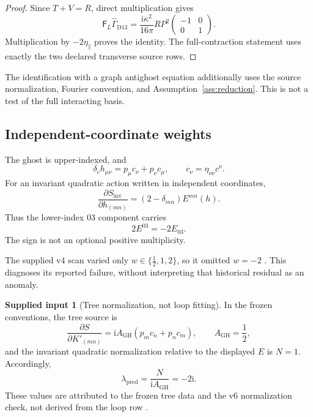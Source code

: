 \documentclass[11pt,a4paper]{article}
\newcommand{\ii}{\mathrm i}
\newcommand{\ka}{\kappa}
\theoremstyle{plain}
\theoremstyle{definition}
\newtheorem{inputstatement}[theorem]{Supplied input}
\theoremstyle{remark}
\numberwithin{equation}{section}
\begin{document}
\begin{proof}
Since \(T+V=R\), direct multiplication gives
\[
 \mathsf F_L\widehat\Gamma_{\mathrm{D13}}
 =\frac{\ii\ka^2}{16\pi}RP^2
   \begin{pmatrix}-1&0\\0&1\end{pmatrix}.
\]
Multiplication by \(-2\eta_\parallel\) proves the identity.
The full-contraction statement uses exactly the two declared
transverse source rows.
\end{proof}

The identification with a graph antighost equation additionally
uses the source normalization, Fourier convention, and
Assumption~\ref{ass:reduction}. This is not a test of the full
interacting basis.

\subsection{Independent-coordinate weights}

The ghost is upper-indexed, and
\[
 \delta_ch_{\mu\nu}=p_\mu c_\nu+p_\nu c_\mu,
 \qquad c_\nu=\eta_{\nu\nu}c^\nu.
\]
For an invariant quadratic action written in independent
coordinates,
\begin{equation}
 \frac{\partial S_{\mathrm{inv}}}{\partial h_{(mn)}}
 =(2-\delta_{mn})E^{mn}(h).
 \label{eq:coordinateweight}
\end{equation}
Thus the lower-index \(03\) component carries
\[
 2E^{03}=-2E_{03}.
\]
The sign is not an optional positive multiplicity.

The supplied v4 scan varied only
\(w\in\{\tfrac12,1,2\}\), so it omitted \(w=-2\)
\cite{CheungConeScripts}. This diagnoses its reported failure,
without interpreting that historical residual as an anomaly.

\begin{inputstatement}[Tree normalization, not loop fitting]
\label{input:tree}
In the frozen conventions, the tree source is
\[
 \frac{\partial S}{\partial K'_{(mn)}}
 =\ii A_{\mathrm{GH}}
      (p_mc_n+p_nc_m),
 \qquad A_{\mathrm{GH}}=\frac12,
\]
and the invariant quadratic normalization relative to the
displayed \(E\) is \(N=1\).
Accordingly,
\begin{equation}
 \lambda_{\mathrm{pred}}
 =\frac{N}{\ii A_{\mathrm{GH}}}=-2\ii.
 \label{eq:lambdapred}
\end{equation}
These values are attributed to the frozen tree data and the v6
normalization check, not derived from the loop row
\cite{CheungP,CheungConeV6}.
\end{inputstatement}
\end{document}

